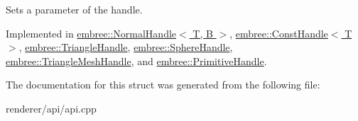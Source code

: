 Sets a parameter of the handle. 



Implemented in \hyperlink{classembree_1_1_normal_handle_a7ff8ed45dbe48d6c86b673665475d6d5}{embree::NormalHandle$<$ T, B $>$}, \hyperlink{classembree_1_1_const_handle_a9815e3ec188766ce256495d0c7831a21}{embree::ConstHandle$<$ T $>$}, \hyperlink{classembree_1_1_triangle_handle_a90619ddedb2908b02b334bf844767693}{embree::TriangleHandle}, \hyperlink{classembree_1_1_sphere_handle_af5087e2534473b8fe63094a78fbe7f41}{embree::SphereHandle}, \hyperlink{classembree_1_1_triangle_mesh_handle_a0a6d78c9b8f82b2a9f87349e5cd92560}{embree::TriangleMeshHandle}, and \hyperlink{classembree_1_1_primitive_handle_ac7fac33f0838f97732fa61cab03f75bd}{embree::PrimitiveHandle}.



The documentation for this struct was generated from the following file:\begin{DoxyCompactItemize}
\item 
renderer/api/api.cpp\end{DoxyCompactItemize}
